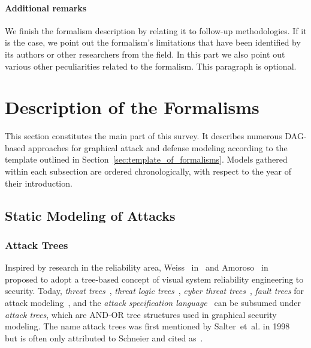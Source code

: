 \documentclass[a4paper]{article}
\begin{document}
\paragraph{Additional remarks}
We finish the formalism description by relating it to follow-up methodologies.
If it is the case, we point out the formalism's limitations that have been
identified by its authors or other researchers from the field. In this part we 
also point out various other peculiarities related to the formalism. This 
paragraph is optional.

\section{Description of the Formalisms}
\label{sec:main_survey}
This section constitutes the main part of this survey. It describes numerous 
DAG-based approaches for graphical attack and defense modeling according to the 
template outlined in Section~\ref{sec:template_of_formalisms}. 
Models gathered within each subsection are ordered chronologically, 
with respect to the year of their introduction. 

\subsection{Static Modeling of Attacks}
\label{sec:offensive_static}

\subsubsection{Attack Trees} 
\label{sec:attack_trees}

Inspired by research in the reliability area, Weiss~\cite{Weis} in~ and
Amoroso~\cite{Amor} in~ proposed to adopt a tree-based concept of visual
system reliability engineering to security. Today, \emph{threat
trees}~\cite{Amor,SwSn,HoLe,MaDoHeKoXu,DepD}, \emph{threat logic
trees}~\cite{Weis}, \emph{cyber threat trees}~\cite{OnTuThNaSzMa},
\emph{fault trees} for attack modeling~\cite{StSc}, and the \emph{attack
specification language}~\cite{TiLaFiHa} can be subsumed under \emph{attack
trees}, which are AND-OR tree structures used in graphical security modeling.
The name attack trees was first mentioned by Salter~et~al. in
1998~\cite{SaSaScWa} but is often only attributed to Schneier and cited
as~\cite{Schn,Schn2}.
\end{document}
